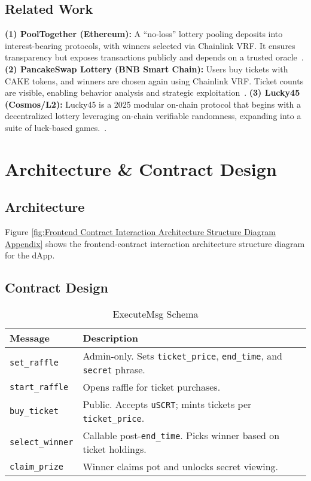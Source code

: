 \documentclass{article}
\begin{document}
\subsection{Related Work}
\textbf{(1) PoolTogether (Ethereum):} A ``no-loss'' lottery pooling deposits into interest-bearing protocols, with winners selected via Chainlink VRF. It ensures transparency but exposes transactions publicly and depends on a trusted oracle~\cite{PoolTogether}. \textbf{(2) PancakeSwap Lottery (BNB Smart Chain):} Users buy tickets with CAKE tokens, and winners are chosen again using Chainlink VRF. Ticket counts are visible, enabling behavior analysis and strategic exploitation~\cite{PancakeSwap}. \textbf{(3) Lucky45 (Cosmos/L2):} Lucky45 is a 2025 modular on-chain protocol that begins with a decentralized lottery leveraging on-chain verifiable randomness, expanding into a suite of luck-based games.~\cite{Lucky45}.

\section{Architecture \& Contract Design}

\subsection{Architecture}
Figure \ref{fig:Frontend Contract Interaction Architecture Structure Diagram Appendix} shows the frontend-contract interaction architecture structure diagram for the dApp.

\subsection{Contract Design}

\begin{table}[h]
  \centering
  \caption{ExecuteMsg Schema}
  \begin{tabular}{@{}lp{9cm}@{}}
    \toprule
    \textbf{Message} & \textbf{Description} \\
    \midrule
    \texttt{set\_raffle} & Admin-only. Sets \texttt{ticket\_price}, \texttt{end\_time}, and \texttt{secret} phrase. \\
    \midrule
    \texttt{start\_raffle} & Opens raffle for ticket purchases. \\
    \midrule
    \texttt{buy\_ticket} & Public. Accepts \texttt{uSCRT}; mints tickets per \texttt{ticket\_price}. \\
    \midrule
    \texttt{select\_winner} & Callable post-\texttt{end\_time}. Picks winner based on ticket holdings. \\
    \midrule
    \texttt{claim\_prize} & Winner claims pot and unlocks secret viewing. \\
    \bottomrule
  \end{tabular}
\end{table}
\end{document}

